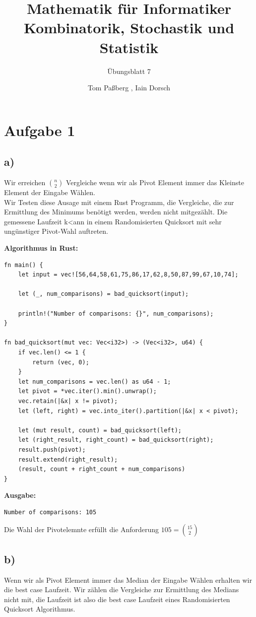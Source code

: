 \documentclass[a4paper]{scrartcl}
\title{Mathematik für Informatiker \\ Kombinatorik, Stochastik und Statistik}
\subtitle{Übungsblatt 7}
\author{Tom Paßberg , Iain Dorsch}
\date{}
\begin{document}
\maketitle

\newpage

\section*{Aufgabe 1}
\subsection*{a)}
Wir erreichen $\binom{n}{2}$ Vergleiche wenn wir als Pivot Element immer das Kleinste Element der Eingabe Wählen. \\
Wir Testen diese Ausage mit einem Rust Programm, die Vergleiche, die zur Ermittlung des Minimums benötigt werden, werden nicht mitgezählt.
Die gemessene Laufzeit k<ann in einem Randomisierten Quicksort mit sehr ungünstiger Pivot-Wahl auftreten. 

\textbf{Algorithmus in Rust:}
\begin{lstlisting}
fn main() {
	let input = vec![56,64,58,61,75,86,17,62,8,50,87,99,67,10,74];

	let (_, num_comparisons) = bad_quicksort(input);

	println!("Number of comparisons: {}", num_comparisons);
}

fn bad_quicksort(mut vec: Vec<i32>) -> (Vec<i32>, u64) {
	if vec.len() <= 1 {
		return (vec, 0);
	}
	let num_comparisons = vec.len() as u64 - 1;
	let pivot = *vec.iter().min().unwrap();
	vec.retain(|&x| x != pivot);
	let (left, right) = vec.into_iter().partition(|&x| x < pivot);

	let (mut result, count) = bad_quicksort(left);
	let (right_result, right_count) = bad_quicksort(right);
	result.push(pivot);
	result.extend(right_result);
	(result, count + right_count + num_comparisons)
}
\end{lstlisting}

\textbf{Ausgabe:}
\begin{lstlisting}
Number of comparisons: 105
\end{lstlisting}
Die Wahl der Pivotelemnte erfüllt die Anforderung $105 = \binom{15}{2}$

\subsection*{b)}
Wenn wir als Pivot Element immer das Median der Eingabe Wählen erhalten wir die best case Laufzeit.
Wir zählen die Vergleiche zur Ermittlung des Medians nicht mit, die Laufzeit ist also die best case Laufzeit eines Randomisierten Quicksort Algorithmus.
\end{document}
